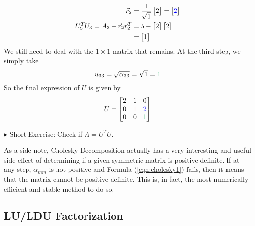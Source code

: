 \begin{solution}
\begin{align*}
\vec{r}_2 &= \frac{1}{\sqrt{1}}
\begin{bmatrix}
2
\end{bmatrix}
=
\begin{bmatrix}
\textcolor{blue}{2}
\end{bmatrix} \\
U_3^T U_3 = A_3  - \vec{r}_2\vec{r}_2^T &=
5 - 
\begin{bmatrix}
2
\end{bmatrix}
\begin{bmatrix}
2
\end{bmatrix} \\
&= 
\begin{bmatrix}
1
\end{bmatrix}
\end{align*}
We still need to deal with the $1 \times 1$ matrix that remains. At the third step, we simply take
\begin{align*}
u_{33} = \sqrt{\alpha_{33}} = \sqrt{1} = \textcolor{Green}{1}
\end{align*}
So the final expression of $U$ is given by
\begin{align*}
U = 
\begin{bmatrix}
2 & 1 & 0 \\
0 & \textcolor{red}{1} & \textcolor{blue}{2} \\
0 & 0 & \textcolor{Green}{1}
\end{bmatrix}
\end{align*}
\end{solution}
$\blacktriangleright$ Short Exercise: Check if $A = U^T U$.\footnotemark\par
As a side note, Cholesky Decomposition actually has a very interesting and useful side-effect of determining if a given symmetric matrix is positive-definite. If at any step, $\alpha_{mm}$ is not positive and Formula (\ref{eqn:cholesky1}) fails, then it means that the matrix cannot be positive-definite.\footnotemark{} This is, in fact, the most numerically efficient and stable method to do so.

\subsection{LU/LDU Factorization}

